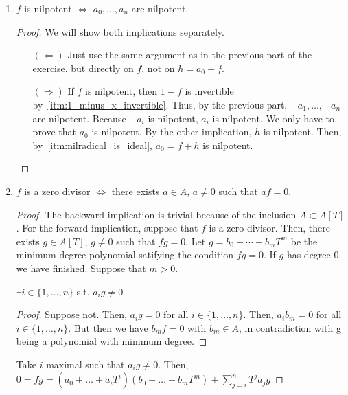 \begin{problem}
\begin{enumerate}[label=(\theproblem.\arabic*),ref=\theproblem.\arabic*]
        \item $f$ is nilpotent $\iff$ $a_0, \ldots, a_n$ are nilpotent.
            \begin{sol}
                \begin{proof}
                    We will show both implications separately.
                    \begin{itemize}
                        \item[$(\Leftarrow)$]
                        Just use the same argument as in the previous part of the exercise, but directly on $f$, not on $h = a_0-f$.
                        \item[$(\Rightarrow)$]
                        If $f$ is nilpotent, then $1 - f$ is invertible by~\ref{itm:1_minus_x_invertible}.
                        Thus, by the previous part, $-a_1, \ldots, -a_n$ are nilpotent.
                        Because $-a_i$ is nilpotent, $a_i$ is nilpotent.
                        We only have to prove that $a_0$ is nilpotent.
                        By the other implication, $h$ is nilpotent.
                        Then, by~\ref{itm:nilradical_is_ideal}, $a_0 = f + h$ is nilpotent.
                    \end{itemize}
                \end{proof}
            \end{sol}
        \item $f$ is a zero divisor $\iff$ there exists $a \in A$, $a \neq 0$ such that $af = 0$.
            \begin{sol}
                \begin{proof}
                    The backward implication is trivial because of the inclusion $A \subset A[T]$.
                    For the forward implication, suppose that $f$ is a zero divisor.
                    Then, there exists $g \in A[T]$, $g \neq 0$ such that $fg = 0$.
                    Let $g = b_0 + \cdots + b_m T^m$ be the minimum degree polynomial satifying the condition $fg = 0$.
                    If $g$ has degree $0$ we have finished. Suppose that $m > 0$.
                    \begin{claim}
                        $\exists i \in \{1, \ldots, n\}$ s.t. $a_i g \neq 0$
                        \begin{proof}
                            Suppose not.
                            Then, $a_i g = 0$ for all $i \in \{1, \dots, n\}$.
                            Then, $a_i b_m = 0$ for all $i \in \{1, \dots, n\}$.
                            But then we have $b_m f = 0$ with $b_m \in A$, in contradiction with g being a polynomial with minimum degree.
                        \end{proof}
                    \end{claim}
                    Take $i$ maximal such that $a_i g \neq 0$.
                    Then, $0 = f g = (a_0 + \dots + a_i T^i) (b_0 + \dots + b_m T^m) + \sum_{j=i}^n T^j a_j g$
                \end{proof}
            \end{sol}
    \end{enumerate}
\end{problem}
